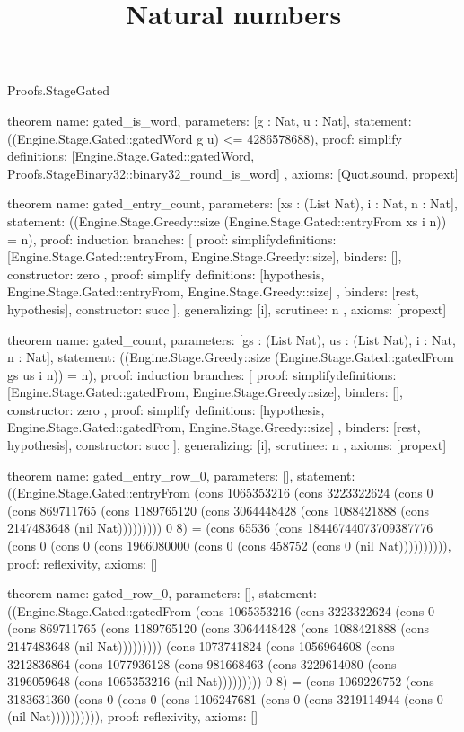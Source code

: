\begin{lexlean}{Proofs.StageGated}
\title{Natural numbers}
\begin{semanticmodule}
theorem{
  name: gated_is_word,
  parameters: [g : Nat, u : Nat],
  statement: ((Engine.Stage.Gated::gatedWord g u) <= 4286578688),
  proof: simplify{
    definitions: [Engine.Stage.Gated::gatedWord, Proofs.StageBinary32::binary32_round_is_word]
  },
  axioms: [Quot.sound, propext]
}

theorem{
  name: gated_entry_count,
  parameters: [xs : (List Nat), i : Nat, n : Nat],
  statement: ((Engine.Stage.Greedy::size (Engine.Stage.Gated::entryFrom xs i n)) = n),
  proof: induction{
    branches: [
      {
        proof: simplify{definitions: [Engine.Stage.Gated::entryFrom, Engine.Stage.Greedy::size]},
        binders: [],
        constructor: zero
      },
      {
        proof: simplify{
          definitions: [hypothesis, Engine.Stage.Gated::entryFrom, Engine.Stage.Greedy::size]
        },
        binders: [rest, hypothesis],
        constructor: succ
      }
    ],
    generalizing: [i],
    scrutinee: n
  },
  axioms: [propext]
}

theorem{
  name: gated_count,
  parameters: [gs : (List Nat), us : (List Nat), i : Nat, n : Nat],
  statement: ((Engine.Stage.Greedy::size (Engine.Stage.Gated::gatedFrom gs us i n)) = n),
  proof: induction{
    branches: [
      {
        proof: simplify{definitions: [Engine.Stage.Gated::gatedFrom, Engine.Stage.Greedy::size]},
        binders: [],
        constructor: zero
      },
      {
        proof: simplify{
          definitions: [hypothesis, Engine.Stage.Gated::gatedFrom, Engine.Stage.Greedy::size]
        },
        binders: [rest, hypothesis],
        constructor: succ
      }
    ],
    generalizing: [i],
    scrutinee: n
  },
  axioms: [propext]
}

theorem{
  name: gated_entry_row_0,
  parameters: [],
  statement: ((Engine.Stage.Gated::entryFrom (cons 1065353216 (cons 3223322624 (cons 0 (cons 869711765 (cons 1189765120 (cons 3064448428 (cons 1088421888 (cons 2147483648 (nil Nat))))))))) 0 8) = (cons 65536 (cons 18446744073709387776 (cons 0 (cons 0 (cons 1966080000 (cons 0 (cons 458752 (cons 0 (nil Nat)))))))))),
  proof: reflexivity{},
  axioms: []
}

theorem{
  name: gated_row_0,
  parameters: [],
  statement: ((Engine.Stage.Gated::gatedFrom (cons 1065353216 (cons 3223322624 (cons 0 (cons 869711765 (cons 1189765120 (cons 3064448428 (cons 1088421888 (cons 2147483648 (nil Nat))))))))) (cons 1073741824 (cons 1056964608 (cons 3212836864 (cons 1077936128 (cons 981668463 (cons 3229614080 (cons 3196059648 (cons 1065353216 (nil Nat))))))))) 0 8) = (cons 1069226752 (cons 3183631360 (cons 0 (cons 0 (cons 1106247681 (cons 0 (cons 3219114944 (cons 0 (nil Nat)))))))))),
  proof: reflexivity{},
  axioms: []
}
\end{semanticmodule}
\end{lexlean}
